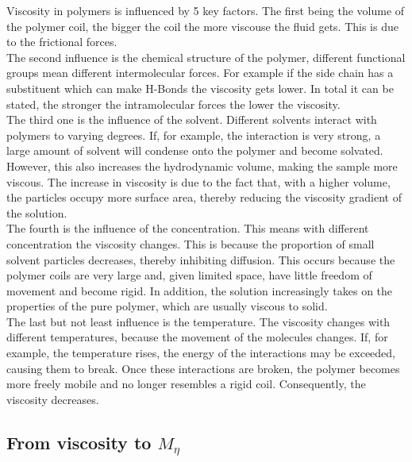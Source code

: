 \documentclass[10pt,a4paper,ngerman]{scrartcl}
\begin{document}
		
		

		Viscosity in polymers is influenced by 5 key factors.
		The first being the volume of the polymer coil, the bigger the coil the more viscouse the fluid gets.
		This is due to the frictional forces.\\
		The second influence is the chemical structure of the polymer, different functional groups mean different intermolecular forces.
		For example if the side chain has a substituent which can make H-Bonds the viscosity gets lower.
		In total it can be stated, the stronger the intramolecular forces the lower the viscosity.\\

		The third one is the influence of the solvent. Different solvents interact with polymers to varying degrees. If, for example, the interaction is very strong, 
		a large amount of solvent will condense onto the polymer and become solvated. However, this also increases the hydrodynamic volume, making the sample more 
		viscous. The increase in viscosity is due to the fact that, with a higher volume, the particles occupy more surface area, thereby reducing the viscosity 
		gradient of the solution. \\

		The fourth is the influence of the concentration. This means with different concentration the viscosity changes.
		This is because the proportion of small solvent particles decreases, thereby inhibiting diffusion. This occurs because the polymer coils are very large and, 
		given limited space, have little freedom of movement and become rigid. In addition, the solution increasingly takes on the properties of the pure polymer, which 
		are usually viscous to solid. \\

		The last but not least influence is the temperature. The viscosity changes with different temperatures, because the movement of the molecules changes.
		If, for example, the temperature rises, the energy of the interactions may be exceeded, causing them to break. Once these interactions are broken, the polymer 
		becomes more freely mobile and no longer resembles a rigid coil. Consequently, the viscosity decreases.\cite{polyskript}\\

	\subsection{From viscosity to $M_\eta$}
\end{document}
